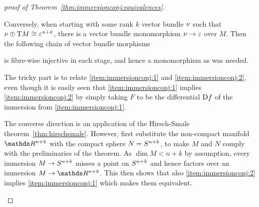 \begin{proof}[proof of Theorem~\ref{thm:immersionconj:equivalences}]
\begin{description}
    Conversely, when starting with some rank $k$ vector bundle $\nu_{}$
    such that $\nu_{}\oplus\mathrm{T}M\cong\varepsilon^{n+k}$, there is a vector
    bundle monomorphism $\nu_{}\to\varepsilon$ over $M$. Then the
    following chain of vector bundle morphisms
    \begin{center}
    \end{center}
    is fibre-wise injective in each stage, and hence a monomorphism as
    was needed.
  \item[\ref{item:immersionconj:1}$\Leftrightarrow$\ref{item:immersionconj:2}:]
    The tricky part is to relate \ref{item:immersionconj:1} and
    \ref{item:immersionconj:2}, even though it is easily seen that
    \ref{item:immersionconj:1} implies \ref{item:immersionconj:2} by
    simply taking $F$ to be the differential $\mathrm{D} f$ of the
    immersion from \ref{item:immersionconj:1}.
    
    The converse direction is an application of the Hirsch-Smale
    theorem~\ref{thm:hirschsmale}.
    However, first substitute the non-compact manifold $\R^{n+k}$ with
    the compact sphere $N=S^{n+k}$, to make $M$ and $N$ comply
    with the preliminaries of the theorem. As $\dim M<n+k$ by assumption,
    every immersion $M\to S^{n+k}$ misses a point on
    $S^{n+k}$ and hence factors over an immersion $M\to\R^{n+k}$.
    This then shows that also \ref{item:immersionconj:2} implies
    \ref{item:immersionconj:1} which makes them equivalent.
    \qedhere
  \end{description}
\end{proof}

